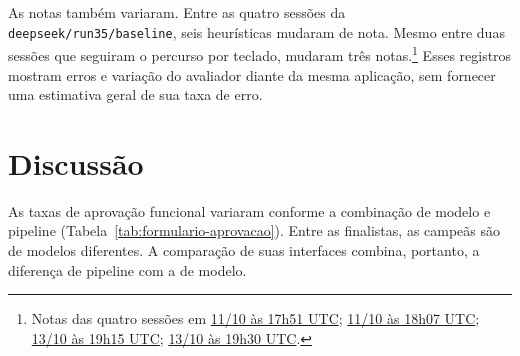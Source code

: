 \documentclass[a4paper,12pt,twoside,english,brazilian]{book}
\begin{document}
As notas também variaram. Entre as quatro sessões da
\texttt{deepseek/run35/baseline}, seis heurísticas mudaram de nota. Mesmo entre duas sessões que
seguiram o percurso por teclado, mudaram três notas.\footnote{Notas das quatro sessões em \href{https://github.com/Educg550/tcc/blob/ee6d001c1f618419c6184644d18aa97bb33bcf9a/demos/runs/batch/deepseek/run35/baseline/_harness/cua-nielsen-opus55-20261011T175120Z/relatorio.md}{11/10 às 17h51 UTC};
\href{https://github.com/Educg550/tcc/blob/ee6d001c1f618419c6184644d18aa97bb33bcf9a/demos/runs/batch/deepseek/run35/baseline/_harness/cua-nielsen-opus55-reexecucao-20261011T180723Z/relatorio.md}{11/10 às 18h07 UTC};
\href{https://github.com/Educg550/tcc/blob/ee6d001c1f618419c6184644d18aa97bb33bcf9a/demos/runs/batch/deepseek/run35/baseline/_harness/cua-nielsen-opus55-20261013T191542Z/relatorio.md}{13/10 às 19h15 UTC};
\href{https://github.com/Educg550/tcc/blob/ee6d001c1f618419c6184644d18aa97bb33bcf9a/demos/runs/batch/deepseek/run35/baseline/_harness/cua-nielsen-opus55-20261013T193004Z/relatorio.md}{13/10 às 19h30 UTC}.} Esses registros mostram
erros e variação do avaliador diante da mesma aplicação, sem fornecer uma estimativa
geral de sua taxa de erro.

\section{Discussão}
\label{sec:formulario-sintese}

As taxas de aprovação funcional variaram conforme a combinação de modelo
e pipeline (Tabela~\ref{tab:formulario-aprovacao}). Entre as finalistas,
as campeãs são de modelos diferentes. A comparação de suas interfaces
combina, portanto, a diferença de pipeline com a de modelo.
\end{document}
